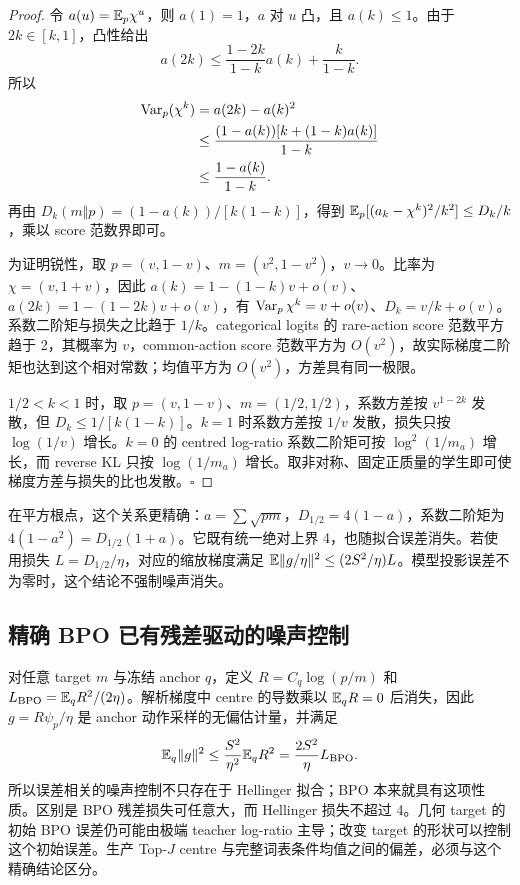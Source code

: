 \begin{proof}
令 $a(u)=\mathbb E_p\chi^u$，则 $a(1)=1$，$a$ 对 $u$ 凸，且 $a(k)\le1$。由于 $2k\in[k,1]$，凸性给出
\begin{equation}
 a(2k)\le\frac{1-2k}{1-k}a(k)+\frac{k}{1-k}.
\end{equation}
所以
\begin{align}
 \operatorname{Var}_p(\chi^k)&=a(2k)-a(k)^2\\
 &\le\frac{(1-a(k))[k+(1-k)a(k)]}{1-k}\\
 &\le\frac{1-a(k)}{1-k}.
\end{align}
再由 $D_k(m\Vert p)=(1-a(k))/[k(1-k)]$，得到 $\mathbb E_p[(a_k-\chi^k)^2/k^2]\le D_k/k$，乘以 score 范数界即可。

为证明锐性，取 $p=(v,1-v)$、$m=(v^2,1-v^2)$，$v\to0$。比率为 $\chi=(v,1+v)$，因此 $a(k)=1-(1-k)v+o(v)$、$a(2k)=1-(1-2k)v+o(v)$，有 $\operatorname{Var}_p\chi^k=v+o(v)$、$D_k=v/k+o(v)$。系数二阶矩与损失之比趋于 $1/k$。categorical logits 的 rare-action score 范数平方趋于 2，其概率为 $v$，common-action score 范数平方为 $O(v^2)$，故实际梯度二阶矩也达到这个相对常数；均值平方为 $O(v^2)$，方差具有同一极限。

$1/2<k<1$ 时，取 $p=(v,1-v)$、$m=(1/2,1/2)$，系数方差按 $v^{1-2k}$ 发散，但 $D_k\le1/[k(1-k)]$。$k=1$ 时系数方差按 $1/v$ 发散，损失只按 $\log(1/v)$ 增长。$k=0$ 的 centred log-ratio 系数二阶矩可按 $\log^2(1/m_a)$ 增长，而 reverse KL 只按 $\log(1/m_a)$ 增长。取非对称、固定正质量的学生即可使梯度方差与损失的比也发散。\hfill$\square$
\end{proof}

在平方根点，这个关系更精确：$a=\sum\sqrt{pm}$，$D_{1/2}=4(1-a)$，系数二阶矩为 $4(1-a^2)=D_{1/2}(1+a)$。它既有统一绝对上界 4，也随拟合误差消失。若使用损失 $L=D_{1/2}/\eta$，对应的缩放梯度满足 $\mathbb E\|g/\eta\|^2\le(2S^2/\eta)L$。模型投影误差不为零时，这个结论不强制噪声消失。

\subsection{精确 BPO 已有残差驱动的噪声控制}

对任意 target $m$ 与冻结 anchor $q$，定义 $R=C_q\log(p/m)$ 和 $L_{\mathrm{BPO}}=\mathbb E_qR^2/(2\eta)$。解析梯度中 centre 的导数乘以 $\mathbb E_qR=0$ 后消失，因此 $g=R\psi_p/\eta$ 是 anchor 动作采样的无偏估计量，并满足
\begin{equation}
 \mathbb E_q\|g\|^2\le\frac{S^2}{\eta^2}\mathbb E_qR^2
 =\frac{2S^2}{\eta}L_{\mathrm{BPO}}.
\end{equation}
所以误差相关的噪声控制不只存在于 Hellinger 拟合；BPO 本来就具有这项性质。区别是 BPO 残差损失可任意大，而 Hellinger 损失不超过 4。几何 target 的初始 BPO 误差仍可能由极端 teacher log-ratio 主导；改变 target 的形状可以控制这个初始误差。生产 Top-$J$ centre 与完整词表条件均值之间的偏差，必须与这个精确结论区分。


